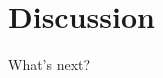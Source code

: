 \documentclass{article}
\begin{document}
\section{Discussion}
\label{sec:discussion}
What's next?

%
%
%
%
%
%
%
\end{document}
